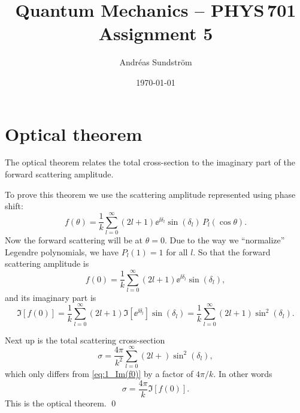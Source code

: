 \documentclass[11pt,letter, swedish, english
]{article}
\begin{document}
\title{Quantum Mechanics -- PHYS\,701 \\
Assignment 5}
\author{Andréas Sundström}
\date{\today}

\maketitle



\section{Optical theorem}
The optical theorem relates the total cross-section to the imaginary
part of the forward scattering amplitude. 

To prove this theorem we use the scattering amplitude represented using
phase shift:
\begin{equation}
f(\theta)=\frac{1}{k}\sum_{l=0}^\infty
(2l+1)\ee^{\ii\delta_l}\sin(\delta_l)\,P_l(\cos\theta).
\end{equation}
Now the forward scattering will be at $\theta=0$. Due to the way
we ``normalize'' Legendre polynomials\footnotemark{}, we have $P_l(1)=1$
for all $l$. So that the forward scattering amplitude is
\begin{equation}
f(0)=\frac{1}{k}\sum_{l=0}^\infty
(2l+1)\ee^{\ii\delta_l}\sin(\delta_l),
\end{equation}
and its imaginary part is
\begin{equation}\label{eq:1_Im(f0)}
\Im[f(0)]=\frac{1}{k}\sum_{l=0}^\infty
(2l+1)\Im[\ee^{\ii\delta_l}]\sin(\delta_l)
=\frac{1}{k}\sum_{l=0}^\infty (2l+1)\sin^2(\delta_l).
\end{equation}


Next up is the total scattering cross-section
\begin{equation}\label{eq:1_sigma}
\sigma=\frac{4\pi}{k^2}\sum_{l=0}^\infty
(2l+)\sin^2(\delta_l),
\end{equation}
which only differs from \eqref{eq:1_Im(f0)} by a factor of
$4\pi/k$. In other words
\begin{equation}
\sigma=\frac{4\pi}{k}\Im[f(0)].
\end{equation}
This is the optical theorem.
\qed
\end{document}

